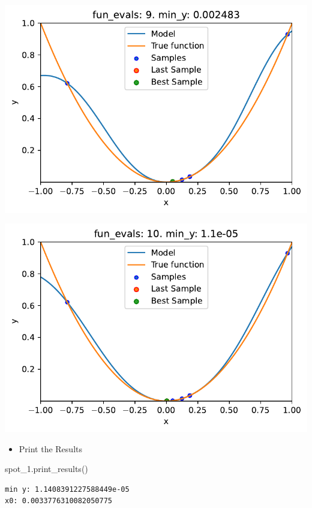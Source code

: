 \documentclass[
  letterpaper,
  DIV=11,
  numbers=noendperiod]{scrreprt}
\newenvironment{Shaded}{\begin{snugshade}}{\end{snugshade}}
\newcommand{\NormalTok}[1]{\textcolor[rgb]{0.00,0.23,0.31}{#1}}
\providecommand{\tightlist}{%
  \setlength{\itemsep}{0pt}\setlength{\parskip}{0pt}}\usepackage{longtable,booktabs,array}
\begin{document}
\includegraphics{010_num_spot_sklearn_surrogate_files/figure-pdf/cell-39-output-8.pdf}

\includegraphics{010_num_spot_sklearn_surrogate_files/figure-pdf/cell-39-output-9.pdf}

\begin{itemize}
\tightlist
\item
  Print the Results
\end{itemize}

\begin{Shaded}
\begin{Highlighting}[]
\NormalTok{spot\_1.print\_results()}
\end{Highlighting}
\end{Shaded}

\begin{verbatim}
min y: 1.1408391227588449e-05
x0: 0.0033776310082050775
\end{verbatim}
\end{document}
